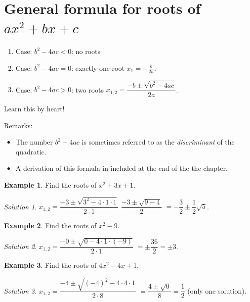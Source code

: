 \documentclass[
  12pt,
  oneside]{book}
\providecommand{\tightlist}{%
  \setlength{\itemsep}{0pt}\setlength{\parskip}{0pt}}
\theoremstyle{definition}
\theoremstyle{definition}
\newtheorem{example}{Example}[chapter]
\theoremstyle{definition}
\theoremstyle{definition}
\theoremstyle{remark}
\newtheorem*{solution}{Solution}
\begin{document}
\section{\texorpdfstring{General formula for roots of \(ax^2+bx+c\)}{General formula for roots of ax\^{}2+bx+c}}\label{general-formula-for-roots-of-ax2bxc}

\begin{enumerate}
\def\labelenumi{\arabic{enumi}.}
\tightlist
\item
  Case: \(b^2-4ac < 0\): no roots
\item
  Case: \(b^2-4ac = 0\): exactly one root \(x_1=-\frac{b}{2a}\).
\item
  Case: \(b^2-4ac > 0\): two roots \(x_{1,2}=\dfrac{-b\pm\sqrt{b^2-4ac}}{2a}\).
\end{enumerate}

Learn this by heart!

Remarks:

\begin{itemize}
\tightlist
\item
  The number \(b^2-4ac\) is sometimes referred to as the \emph{discriminant} of the quadratic.
\item
  A derivation of this formula in included at the end of the the chapter.
\end{itemize}

\begin{example}
Find the roots of \(x^2+3x+1\).
\end{example}

\begin{solution}
\(x_{1,2}=\dfrac{-3\pm\sqrt{3^2-4\cdot1\cdot1}}{2\cdot 1}\) \(\dfrac{-3\pm\sqrt{9-4}}{2}\) \(=-\dfrac{3}{2}\pm\dfrac{1}{2}\sqrt{5}\).
\end{solution}

\begin{example}
Find the roots of \(x^2-9\).
\end{example}

\begin{solution}
\(x_{1,2}=\dfrac{-0\pm\sqrt{0-4\cdot1\cdot(-9)}}{2\cdot1}\) \(=\pm\dfrac{36}{2}=\pm 3\).
\end{solution}

\begin{example}
Find the roots of \(4x^2-4x+1\).
\end{example}

\begin{solution}
\(x_{1,2}=\dfrac{-4\pm\sqrt{(-4)^2-4\cdot 4\cdot 1}}{2\cdot 8}\) \(=\dfrac{4\pm\sqrt{0}}{8}=\dfrac{1}{2}\) (only one solution).
\end{solution}
\end{document}
